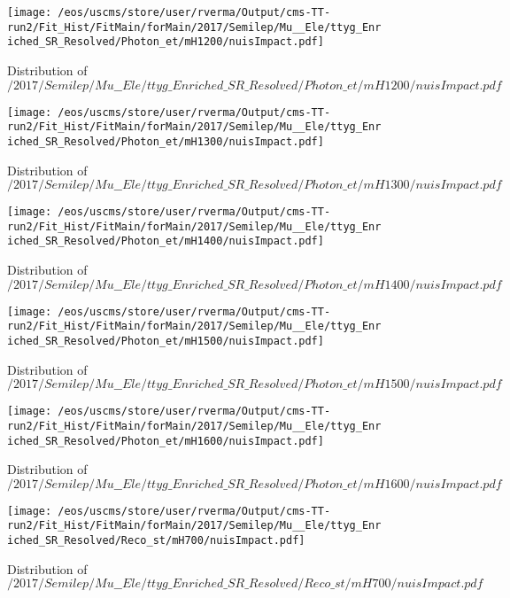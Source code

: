 \begin{figure}
\centering
\texttt{[image: /eos/uscms/store/user/rverma/Output/cms-TT-run2/Fit\_Hist/FitMain/forMain/2017/Semilep/Mu\_\_Ele/ttyg\_Enriched\_SR\_Resolved/Photon\_et/mH1200/nuisImpact.pdf]}
\caption{Distribution of $/2017/Semilep/Mu\_\_Ele/ttyg\_Enriched\_SR\_Resolved/Photon\_et/mH1200/nuisImpact.pdf$}
\end{figure}

\begin{figure}
\centering
\texttt{[image: /eos/uscms/store/user/rverma/Output/cms-TT-run2/Fit\_Hist/FitMain/forMain/2017/Semilep/Mu\_\_Ele/ttyg\_Enriched\_SR\_Resolved/Photon\_et/mH1300/nuisImpact.pdf]}
\caption{Distribution of $/2017/Semilep/Mu\_\_Ele/ttyg\_Enriched\_SR\_Resolved/Photon\_et/mH1300/nuisImpact.pdf$}
\end{figure}

\begin{figure}
\centering
\texttt{[image: /eos/uscms/store/user/rverma/Output/cms-TT-run2/Fit\_Hist/FitMain/forMain/2017/Semilep/Mu\_\_Ele/ttyg\_Enriched\_SR\_Resolved/Photon\_et/mH1400/nuisImpact.pdf]}
\caption{Distribution of $/2017/Semilep/Mu\_\_Ele/ttyg\_Enriched\_SR\_Resolved/Photon\_et/mH1400/nuisImpact.pdf$}
\end{figure}

\begin{figure}
\centering
\texttt{[image: /eos/uscms/store/user/rverma/Output/cms-TT-run2/Fit\_Hist/FitMain/forMain/2017/Semilep/Mu\_\_Ele/ttyg\_Enriched\_SR\_Resolved/Photon\_et/mH1500/nuisImpact.pdf]}
\caption{Distribution of $/2017/Semilep/Mu\_\_Ele/ttyg\_Enriched\_SR\_Resolved/Photon\_et/mH1500/nuisImpact.pdf$}
\end{figure}

\begin{figure}
\centering
\texttt{[image: /eos/uscms/store/user/rverma/Output/cms-TT-run2/Fit\_Hist/FitMain/forMain/2017/Semilep/Mu\_\_Ele/ttyg\_Enriched\_SR\_Resolved/Photon\_et/mH1600/nuisImpact.pdf]}
\caption{Distribution of $/2017/Semilep/Mu\_\_Ele/ttyg\_Enriched\_SR\_Resolved/Photon\_et/mH1600/nuisImpact.pdf$}
\end{figure}

\begin{figure}
\centering
\texttt{[image: /eos/uscms/store/user/rverma/Output/cms-TT-run2/Fit\_Hist/FitMain/forMain/2017/Semilep/Mu\_\_Ele/ttyg\_Enriched\_SR\_Resolved/Reco\_st/mH700/nuisImpact.pdf]}
\caption{Distribution of $/2017/Semilep/Mu\_\_Ele/ttyg\_Enriched\_SR\_Resolved/Reco\_st/mH700/nuisImpact.pdf$}
\end{figure}

